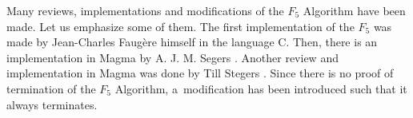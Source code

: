 Many reviews, implementations and modifications of the $F_5$ Algorithm have been made. Let us emphasize some of them. The first implementation of the $F_5$ was made by Jean-Charles Faug\`ere himself in the language C. Then, there is an implementation in Magma by A. J. M. Segers \cite{Segers}. Another review and implementation in Magma was done by Till Stegers \cite{Stegers}. Since there is no proof of termination of the $F_5$ Algorithm, a~modification \cite{ModifyingF5} has been introduced such that it always terminates. 
